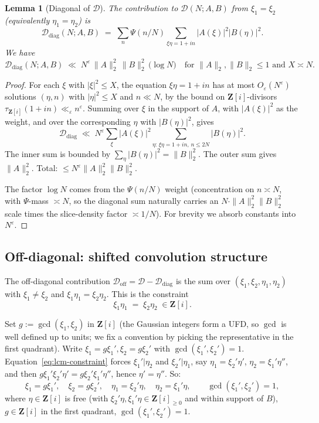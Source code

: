 \documentclass[11pt]{article}
\newtheorem{lemma}[theorem]{Lemma}
\theoremstyle{definition}
\newcommand{\Z}{\mathbf{Z}}
\newcommand{\Zi}{\Z[i]}
\begin{document}
\begin{lemma}[Diagonal of $\mathcal{D}$]\label{lem:diag}
The contribution to $\mathcal{D}(N;A,B)$ from $\xi_1=\xi_2$ (equivalently $\eta_1=\eta_2$) is
\[
\mathcal{D}_{\mathrm{diag}}(N;A,B)\;=\;\sum_n\Psi(n/N)\sum_{\xi\eta=1+in}|A(\xi)|^2|B(\eta)|^2.
\]
We have
\[
\mathcal{D}_{\mathrm{diag}}(N;A,B)\;\ll\;N^\varepsilon\,\|A\|_2^2\,\|B\|_2^2\,\bigl(\log N\bigr)\quad\text{for }\|A\|_2,\|B\|_2\le 1\text{ and }X\asymp N.
\]
\end{lemma}

\begin{proof}
For each $\xi$ with $|\xi|^2\le X$, the equation $\xi\eta=1+in$ has at most $O_\varepsilon(N^\varepsilon)$ solutions $(\eta,n)$ with $|\eta|^2\le X$ and $n\ll N$, by the bound on $\Zi$-divisors $\tau_{\Zi}(1+in)\ll_\varepsilon n^\varepsilon$. Summing over $\xi$ in the support of $A$, with $|A(\xi)|^2$ as the weight, and over the corresponding $\eta$ with $|B(\eta)|^2$, gives
\[
\mathcal{D}_{\mathrm{diag}}\;\ll\;N^\varepsilon\sum_\xi|A(\xi)|^2\sum_{\eta:\,\xi\eta=1+in,\,n\le 2N}|B(\eta)|^2.
\]
The inner sum is bounded by $\sum_\eta|B(\eta)|^2=\|B\|_2^2$. The outer sum gives $\|A\|_2^2$. Total: $\le N^\varepsilon\|A\|_2^2\|B\|_2^2$.

The factor $\log N$ comes from the $\Psi(n/N)$ weight (concentration on $n\asymp N$, with $\Psi$-mass $\asymp N$, so the diagonal sum naturally carries an $N\cdot\|A\|_2^2\|B\|_2^2$ scale times the slice-density factor $\asymp 1/N$). For brevity we absorb constants into $N^\varepsilon$.
\end{proof}

\subsection{Off-diagonal: shifted convolution structure}\label{sec:off-diag}

The off-diagonal contribution $\mathcal{D}_{\mathrm{off}}=\mathcal{D}-\mathcal{D}_{\mathrm{diag}}$ is the sum over $(\xi_1,\xi_2,\eta_1,\eta_2)$ with $\xi_1\ne\xi_2$ and $\xi_1\eta_1=\xi_2\eta_2$. This is the constraint
\begin{equation}\label{eq:lcm-constraint}
\xi_1\eta_1\;=\;\xi_2\eta_2\;\in\Zi.
\end{equation}

Set $g:=\gcd(\xi_1,\xi_2)$ in $\Zi$ (the Gaussian integers form a UFD, so $\gcd$ is well defined up to units; we fix a convention by picking the representative in the first quadrant). Write $\xi_1=g\xi_1',\xi_2=g\xi_2'$ with $\gcd(\xi_1',\xi_2')=1$. Equation~\eqref{eq:lcm-constraint} forces $\xi_1'|\eta_2$ and $\xi_2'|\eta_1$, say $\eta_1=\xi_2'\eta'$, $\eta_2=\xi_1'\eta''$, and then $g\xi_1'\xi_2'\eta'=g\xi_2'\xi_1'\eta''$, hence $\eta'=\eta''$. So:
\begin{equation}\label{eq:offdiag-param}
\xi_1=g\xi_1',\quad\xi_2=g\xi_2',\quad\eta_1=\xi_2'\eta,\quad\eta_2=\xi_1'\eta,\qquad\gcd(\xi_1',\xi_2')=1,
\end{equation}
where $\eta\in\Zi$ is free (with $\xi_2'\eta,\xi_1'\eta\in\Zi_{\ge 0}$ and within support of $B$), $g\in\Zi$ in the first quadrant, $\gcd(\xi_1',\xi_2')=1$.
\end{document}
